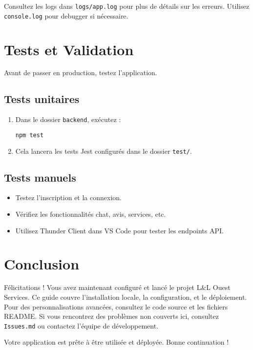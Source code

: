 \documentclass[12pt, a4paper]{article}
\begin{document}
\begin{notebox}
Consultez les logs dans \texttt{logs/app.log} pour plus de détails sur les erreurs. Utilisez \texttt{console.log} pour debugger si nécessaire.
\end{notebox}

\section{Tests et Validation}
Avant de passer en production, testez l'application.

\subsection{Tests unitaires}
\begin{stepbox}
\begin{enumerate}
  \item Dans le dossier \texttt{backend}, exécutez :
  \begin{lstlisting}
npm test
  \end{lstlisting}
  \item Cela lancera les tests Jest configurés dans le dossier \texttt{test/}.
\end{enumerate}
\end{stepbox}

\subsection{Tests manuels}
\begin{itemize}
  \item Testez l'inscription et la connexion.
  \item Vérifiez les fonctionnalités chat, avis, services, etc.
  \item Utilisez Thunder Client dans VS Code pour tester les endpoints API.
\end{itemize}

\section{Conclusion}
Félicitations ! Vous avez maintenant configuré et lancé le projet L\&L Ouest Services. Ce guide couvre l'installation locale, la configuration, et le déploiement. Pour des personnalisations avancées, consultez le code source et les fichiers README. Si vous rencontrez des problèmes non couverts ici, consultez \texttt{Issues.md} ou contactez l'équipe de développement.

\begin{successbox}[Succès]
Votre application est prête à être utilisée et déployée. Bonne continuation !
\end{successbox}
\end{document}
